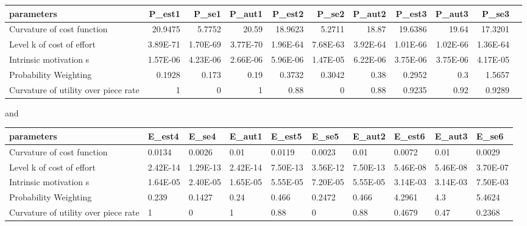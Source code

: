 \documentclass[11pt
]{article}
\begin{document}
{\setlength\tabcolsep{2.5pt}\small
\begin{longtable}{l*{10}{r}}
\toprule()
parameters & P\_est1 & P\_se1 & P\_aut1 & P\_est2 & P\_se2 & P\_aut2 &
P\_est3 & P\_aut3 & P\_se3 \\
\midrule()
\endhead
Curvature of cost function & 20.9475 & 5.7752 & 20.59 & 18.9623 & 5.2711
& 18.87 & 19.6386 & 19.64 & 17.3201 \\
Level k of cost of effort & 3.89E-71 & 1.70E-69 & 3.77E-70 & 1.96E-64 &
7.68E-63 & 3.92E-64 & 1.01E-66 & 1.02E-66 & 1.36E-64 \\
Intrinsic motivation s & 1.57E-06 & 4.23E-06 & 2.66E-06 & 5.96E-06 &
1.47E-05 & 6.22E-06 & 3.75E-06 & 3.75E-06 & 4.17E-05 \\
Probability Weighting & 0.1928 & 0.173 & 0.19 & 0.3732 & 0.3042 & 0.38 &
0.2952 & 0.3 & 1.5657 \\
Curvature of utility over piece rate & 1 & 0 & 1 & 0.88 & 0 & 0.88 &
0.9235 & 0.92 & 0.9289 \\
\bottomrule()
\end{longtable}


and

\begin{longtable}[]{@{}llllllllll@{}}
\toprule()
parameters & E\_est4 & E\_se4 & E\_aut1 & E\_est5 & E\_se5 & E\_aut2 &
E\_est6 & E\_aut3 & E\_se6 \\
\midrule()
\endhead
Curvature of cost function & 0.0134 & 0.0026 & 0.01 & 0.0119 & 0.0023 &
0.01 & 0.0072 & 0.01 & 0.0029 \\
Level k of cost of effort & 2.42E-14 & 1.29E-13 & 2.42E-14 & 7.50E-13 &
3.56E-12 & 7.50E-13 & 5.46E-08 & 5.46E-08 & 3.70E-07 \\
Intrinsic motivation s & 1.64E-05 & 2.40E-05 & 1.65E-05 & 5.55E-05 &
7.20E-05 & 5.55E-05 & 3.14E-03 & 3.14E-03 & 7.50E-03 \\
Probability Weighting & 0.239 & 0.1427 & 0.24 & 0.466 & 0.2472 & 0.466 &
4.2961 & 4.3 & 5.4624 \\
Curvature of utility over piece rate & 1 & 0 & 1 & 0.88 & 0 & 0.88 &
0.4679 & 0.47 & 0.2368 \\
\bottomrule()
\end{longtable}

}
\end{document}
